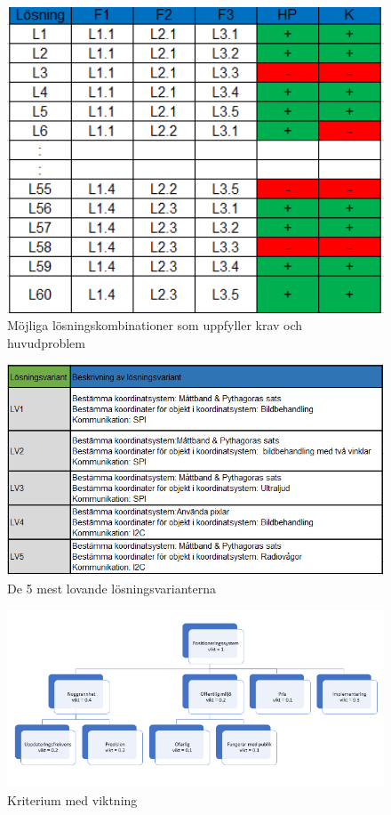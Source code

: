 \documentclass[11pt, a4paper]{report}
\begin{document}
\begin{figure}[H]
	\begin{center}
		\includegraphics [width=12cm,angle=0]{HPK.png}
		\caption{Möjliga lösningskombinationer som uppfyller krav och huvudproblem }
		\label{fig:hpk}
	\end{center}
\end{figure}

\begin{figure}[H]
	\begin{center}
		\includegraphics [width=12cm,angle=0]{5koncept.png}
		\caption{De 5 mest lovande lösningsvarianterna }
		\label{fig:5koncept}
	\end{center}
\end{figure}


\begin{figure}[H]
	\begin{center}
		\includegraphics [width=12cm,angle=0]{kriteriumvikt.png}
		\caption{Kriterium med viktning }
		\label{fig:kriteriumvikt}
	\end{center}
\end{figure}
\end{document}

